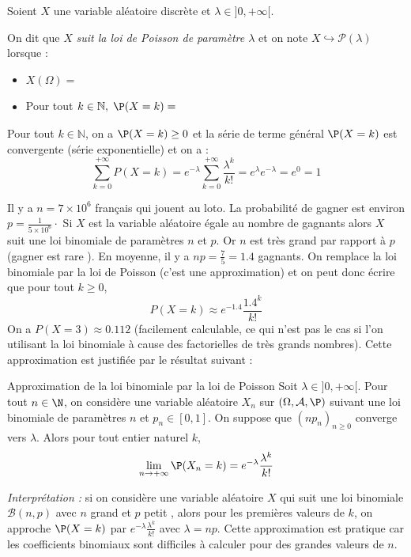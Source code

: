 \documentclass[french,11pt,twoside]{VcCours}
\begin{document}
\begin{Definition}{}
Soient $X$ une variable aléatoire discrète et $\lambda \in ]0,+\infty[$.


On dit que $X$ \emph{suit la loi de Poisson de paramètre $\lambda$} et on note $X \hookrightarrow \mathcal{P}(\lambda)$ lorsque :
\begin{itemize}
 \item $X(\Omega)=\phantom{\mathbb{N}}$
 \item Pour tout $ k \in \mathbb{N},\; \P(X=k)=\phantom{e^{-\lambda}\frac{\lambda^k}{k!} \cdot}$
\end{itemize}
\end{Definition}

Pour tout $k \in \mathbb{N}$, on a $\P(X=k) \geq 0$ et la série de terme général $\P(X=k)$ est convergente (série exponentielle) et on a :
$$ \sum_{k=0}^{+ \infty} P(X=k) = e^{-\lambda} \sum_{k=0}^{+ \infty} \dfrac{\lambda^k}{k!} = e^{\lambda} e^{- \lambda} = e^0=1$$


\begin{Exemple}{} Il y a $n=7 \times 10^{6}$ français qui jouent au loto. La probabilité de gagner est environ $p= \frac{1}{5\times 10^6}\cdot$ Si $X$ est la variable aléatoire égale au nombre de gagnants alors $X$ suit une loi binomiale de paramètres $n$ et $p$. Or $n$ est très grand par rapport à $p$ (gagner est \og rare \fg). En moyenne, il y a $np = \frac{7}{5}=1.4$ gagnants. On remplace la loi binomiale par la loi de Poisson (c'est une approximation) et on peut donc écrire que pour tout $k \geq 0$,
\[ P(X=k) \approx e^{-1.4} \frac{1.4^k}{k!}\]
On a $P(X=3) \approx 0.112$ (facilement calculable, ce qui n'est pas le cas si l'on utilisant la loi binomiale à cause des factorielles de très grands nombres). Cette approximation est justifiée par le résultat suivant :
\end{Exemple}

\begin{Proposition}{Approximation de la loi binomiale par la loi de Poisson}
Soit $\lambda \in ]0,+\infty[$. Pour tout $n \in \N$, on considère une variable aléatoire $X_n$ sur $(\Omega, \mathcal{A}, \P)$ suivant une loi binomiale de paramètres $n$ et $p_n \in [0,1]$. On suppose que $(np_n)_{n \geq 0}$ converge vers $\lambda$. Alors pour tout entier naturel $k$, 
 $$ \lim_{n\to +\infty} \P(X_n = k) = e^{-\lambda} \frac{\lambda^k}{k!}$$
\end{Proposition}

\emph{Interprétation :} si on considère une variable aléatoire $X$ qui suit une loi binomiale $\mathcal B(n,p)$ avec $n$ \og grand \fg et $p$ \og petit \fg, alors pour les premières valeurs de $k$, on approche $\P(X=k)$ par $e^{-\lambda} \frac{\lambda^k}{k !}$ avec $\lambda = np$. Cette approximation est pratique car les coefficients binomiaux sont difficiles à calculer pour des grandes valeurs de $n$.
\end{document}
